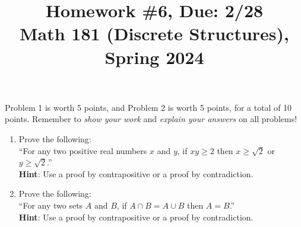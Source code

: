 \documentclass[11pt]{article}
\title{Homework \#6, Due: 2/28 \\Math 181 (Discrete Structures), Spring 2024}
\date{}
\begin{document}
\maketitle

\thispagestyle{empty}

\vspace{-1cm}

Problem 1 is worth 5 points, and Problem 2 is worth 5 points, for a total of 10 points. Remember to \emph{show your work} and \emph{explain your answers} on all problems!

\begin{enumerate}
\item Prove the following: \\
``For any two positive real numbers $x$ and $y$, if $xy \geq 2$ then $x \geq \sqrt{2}$ or~$y \geq \sqrt{2}$.'' \\
{\bf Hint}: Use a proof by contrapositive or a proof by contradiction.

\item Prove the following: \\
``For any two sets $A$ and $B$, if $A\cap B = A\cup B$ then $A=B$.'' \\
{\bf Hint}: Use a proof by contrapositive or a proof by contradiction.
\end{enumerate}
\end{document}
